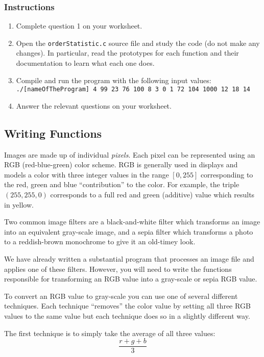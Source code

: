 \documentclass[12pt]{scrartcl}
\begin{document}
\subsubsection*{Instructions}

\begin{enumerate}
  \item Complete question 1 on your worksheet.
  \item Open the \texttt{orderStatistic.c} source file and
	study the code (do not make any changes).  In particular, read
	the prototypes for each function and their documentation to
	learn what each one does.  
  \item Compile and run the program with the following input values: \\
	\texttt{./[nameOfTheProgram] 4 99 23 76 100 8 3 0 1 72 104 1000 12 18 14}
  \item Answer the relevant questions on your worksheet.
\end{enumerate}

\subsection{Writing Functions}

Images are made up of individual \emph{pixels}.  Each pixel can be 
represented using an RGB (red-blue-green) color scheme.  RGB is 
generally used in displays and models a color with three integer 
values in the range $[0, 255]$ corresponding to the red, green and 
blue ``contribution'' to the color.  For example, the triple 
$(255, 255, 0)$ corresponds to a full red and green (additive) value
which results in yellow.  

Two common image filters are a black-and-white filter which transforms
an image into an equivalent gray-scale image, and a sepia filter which
transforms a photo to a reddish-brown monochrome to give it an old-timey
look.

We have already written a substantial program that processes an image
file and applies one of these filters.  However, you will need to write
the functions responsible for transforming an RGB value into a gray-scale
or sepia RGB value.  

To convert an RGB value to gray-scale you can use one of several
different techniques.  Each technique ``removes'' the color value by
setting all three RGB values to the same value but each technique 
does so in a slightly different way.

The first technique is to simply take the average of all three values:
  $$\frac{r + g + b}{3}$$
\end{document}
